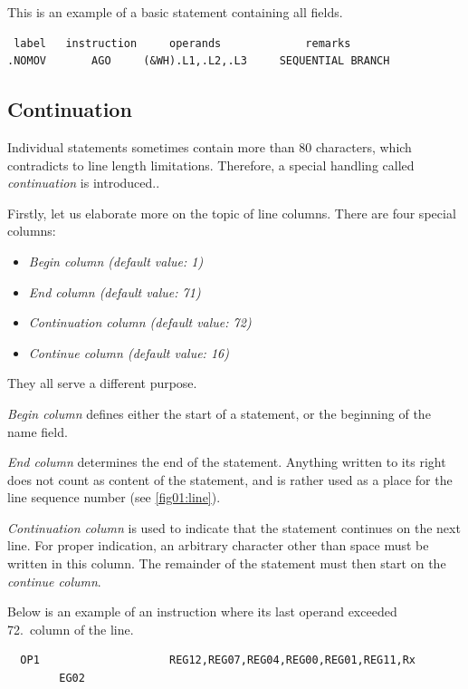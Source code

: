 This is an example of a basic statement containing all fields.
\begin{verbatim}
 label   instruction     operands             remarks
.NOMOV       AGO     (&WH).L1,.L2,.L3     SEQUENTIAL BRANCH
\end{verbatim}

\subsection{Continuation}

Individual statements sometimes contain more than 80 characters, which contradicts to line length limitations. Therefore, a special handling called \emph{continuation} is introduced..

Firstly, let us elaborate more on the topic of line columns. There are four special columns:
\begin{itemize}
	\item \emph{Begin column (default value: 1)}
	
	\item \emph{End column (default value: 71)}
	
	\item \emph{Continuation column (default value: 72)}
	
	\item \emph{Continue column (default value: 16)}
\end{itemize}
They all serve a different purpose.

\textit{Begin column} defines either the start of a statement, or the beginning of the name field.

\textit{End column} determines the end of the statement. Anything written to its right does not count as content of the statement, and is rather used as a place for the line sequence number (see \ref{fig01:line}). 

\textit{Continuation column} is used to indicate that the statement continues on the next line. For proper indication, an arbitrary character other than space must be written in this column. The remainder of the statement must then start on the \textit{continue column}.

Below is an example of an instruction where its last operand exceeded 72.~column of the line.
\begin{verbatim}
  OP1                    REG12,REG07,REG04,REG00,REG01,REG11,Rx
        EG02
\end{verbatim} 

